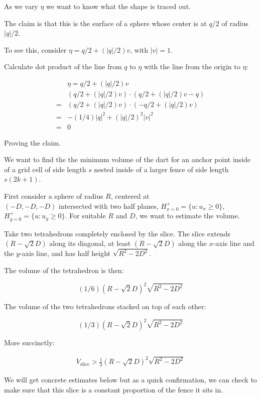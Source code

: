\documentclass[a4paper,fleqn]{cas-dc}
\begin{document}
As we vary $\eta$ we want to know what the shape is traced out.

The claim is that this is the surface of a sphere whose center is at $q/2$
of radius $|q|/2$.

To see this, consider $\eta = q/2 + (|q| / 2) v$, with $|v| = 1$.

Calculate dot product of the line from $q$ to $\eta$ with the line from the origin to $\eta$:

$$
\begin{array}{ll}
  & \eta = q/2 + (|q| / 2) v \\
  & (q/2 + (|q|/2) v) \cdot (q/2 + (|q|/2) v - q ) \\
  = & (q/2 + (|q|/2) v) \cdot ( -q/2 + (|q|/2) v ) \\
  = & -(1/4)|q|^2 + (|q|/2) ^2 |v|^2 \\
  = & 0
\end{array}
$$

Proving the claim.

We want to find the the minimum volume of the dart
for an anchor point inside of a grid cell of side length $s$
nested inside of a larger fence of side length $s(2k+1)$.

First consider a sphere of radius $R$, centered at \\
$(-D,-D,-D)$ intersected with two
half planes, $H ^ + _ {x=0} = \{ u : u _ x \ge 0 \}$, $H ^ + _ {y=0} = \{ u : u _ y \ge 0 \}$.
For suitable $R$ and $D$, we want to estimate the volume.

Take two tetrahedrons completely enclosed by the slice. The slice extends $(R-\sqrt{2}D)$ along its diagonal,
at least $(R-\sqrt{2}D)$ along the $x$-axis line and the $y$-axis line,
and has half height $\sqrt{R^2 - 2 D^2}$.

The volume of the tetrahedron is then:

$$
(1/6) (R - \sqrt{2} D)^2 \sqrt{R^2 - 2 D^2}
$$

The volume of the two tetrahedrons stacked on top of each other:

$$
(1/3) (R - \sqrt{2} D)^2 \sqrt{R^2 - 2 D^2}
$$

More succinctly:

$$
\begin{array}{l}
  V _ {\text{slice}} > \frac{1}{3} (R - \sqrt{2} D)^2 \sqrt{R^2 - 2 D ^ 2}
\end{array}
$$

We will get concrete estimates below but as a quick confirmation, we can check to make sure that
this slice is a constant proportion of the fence it sits in.
\end{document}
